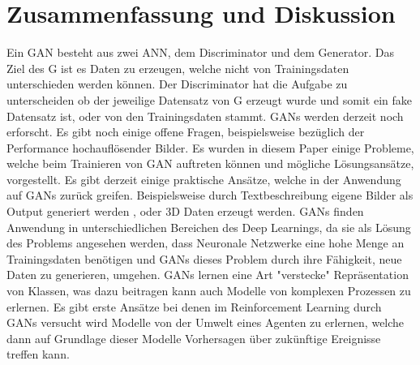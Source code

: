 \documentclass{llncs}
\begin{document}
\section{Zusammenfassung und Diskussion }
Ein GAN besteht aus zwei ANN, dem Discriminator und dem Generator. Das Ziel des G ist es Daten zu erzeugen, welche nicht von Trainingsdaten unterschieden werden können. Der Discriminator hat die Aufgabe zu unterscheiden ob der jeweilige Datensatz von G erzeugt wurde und somit ein fake Datensatz ist, oder von den Trainingsdaten stammt\cite{goodfellow2014}. GANs werden derzeit noch erforscht. Es gibt noch einige offene Fragen, beispielsweise bezüglich der Performance hochauflösender Bilder\cite{ende}. Es wurden in diesem Paper einige Probleme, welche beim Trainieren von GAN auftreten können und mögliche Lösungsansätze, vorgestellt. Es gibt derzeit einige praktische Ansätze, welche in der Anwendung auf GANs zurück greifen. Beispielsweise durch Textbeschreibung eigene Bilder als Output generiert werden \cite{texttoimage}, oder 3D Daten erzeugt werden\cite{3dgan}. GANs finden Anwendung in unterschiedlichen Bereichen des Deep Learnings, da sie als Lösung des Problems angesehen werden, dass Neuronale Netzwerke eine hohe Menge an Trainingsdaten benötigen und GANs dieses Problem durch ihre Fähigkeit, neue Daten zu generieren, umgehen. GANs lernen eine Art "verstecke" Repräsentation von Klassen, was dazu beitragen kann auch Modelle von komplexen Prozessen zu erlernen. Es gibt erste Ansätze bei denen im Reinforcement Learning durch GANs versucht wird Modelle von der Umwelt eines Agenten zu erlernen, welche dann auf Grundlage dieser Modelle Vorhersagen über zukünftige Ereignisse treffen kann\cite{reinforcment}.
\newpage
\listoffigures
\newpage
\listoftables
\newpage


\end{document}

